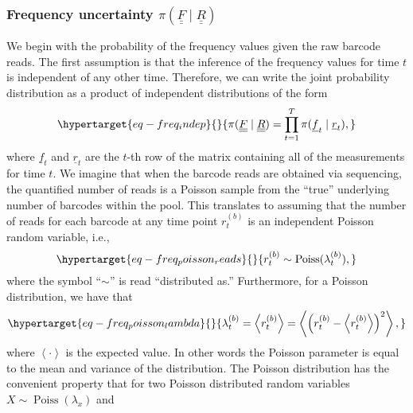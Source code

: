 \documentclass[
  letterpaper,
  DIV=11,
  numbers=noendperiod]{scrartcl}
\begin{document}
\begin{refsegment}
\hypertarget{sec-bayes_freq}{%
\subsubsection{\texorpdfstring{Frequency uncertainty
\(\pi(\underline{\underline{F}} \mid \underline{\underline{R}})\)}{Frequency uncertainty \textbackslash pi(\textbackslash underline\{\textbackslash underline\{F\}\} \textbackslash mid \textbackslash underline\{\textbackslash underline\{R\}\})}}\label{sec-bayes_freq}}

We begin with the probability of the frequency values given the raw
barcode reads. The first assumption is that the inference of the
frequency values for time \(t\) is independent of any other time.
Therefore, we can write the joint probability distribution as a product
of independent distributions of the form
\begin{equation}\protect\hypertarget{eq-freq_indep}{}{
\pi(\underline{\underline{F}} \mid \underline{\underline{R}}) =
\prod_{t=1}^T \pi(\underline{f}_t \mid \underline{r}_t),
}\label{eq-freq_indep}\end{equation} where \(\underline{f}_t\) and
\(\underline{r}_t\) are the \(t\)-th row of the matrix containing all of
the measurements for time \(t\). We imagine that when the barcode reads
are obtained via sequencing, the quantified number of reads is a Poisson
sample from the ``true'' underlying number of barcodes within the pool.
This translates to assuming that the number of reads for each barcode at
any time point \(r^{(b)}_t\) is an independent Poisson random variable,
i.e., \begin{equation}\protect\hypertarget{eq-freq_poisson_reads}{}{
r^{(b)}_t \sim \operatorname{Poiss}(\lambda^{(b)}_t),
}\label{eq-freq_poisson_reads}\end{equation} where the symbol
``\(\sim\)'' is read ``distributed as.'' Furthermore, for a Poisson
distribution, we have that
\begin{equation}\protect\hypertarget{eq-freq_poisson_lambda}{}{
\lambda^{(b)}_t = \left\langle r^{(b)}_t \right\rangle = 
\left\langle 
    \left( r^{(b)}_t - \left\langle r^{(b)}_t \right\rangle \right)^2
\right\rangle,
}\label{eq-freq_poisson_lambda}\end{equation} where
\(\left\langle \cdot \right\rangle\) is the expected value. In other
words the Poisson parameter is equal to the mean and variance of the
distribution. The Poisson distribution has the convenient property that
for two Poisson distributed random variables
\(X \sim \operatorname{Poiss}(\lambda_x)\) and

\end{refsegment}
\end{document}
